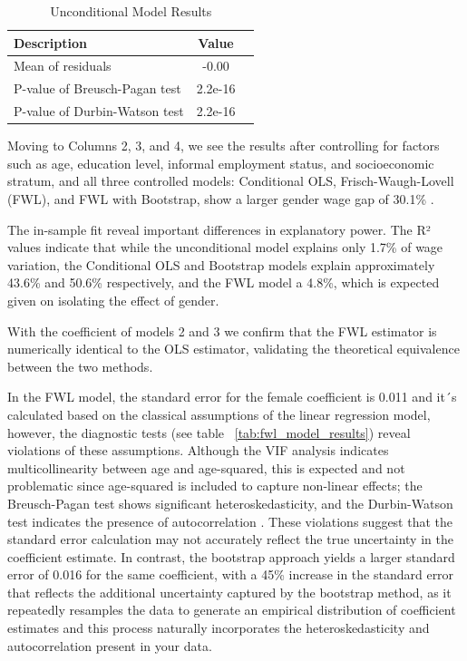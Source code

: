 \documentclass[a4paper,12pt]{article}
\begin{document}
\begin{table}[H]
\caption{Unconditional Model Results} 
\label{tab:unconditional_model_results}
\centering
\vspace{0.5cm} %
\begin{tabular}{lcc}
    \textbf{Description} & \textbf{Value} \\ 
    \hline \hline
    Mean of residuals & -0.00 \\ 
    P-value of Breusch-Pagan test & 2.2e-16\\ 
    P-value of Durbin-Watson test & 2.2e-16 \\ 
    \hline
\end{tabular}
\end{table}



Moving to Columns 2, 3, and 4, we see the results after controlling for factors such as age, education level, informal employment status, and socioeconomic stratum, and all three controlled models: Conditional OLS, Frisch-Waugh-Lovell (FWL), and FWL with Bootstrap, show a larger gender wage gap of 30.1\% .

The in-sample fit reveal important differences in explanatory power. The R² values indicate that while the unconditional model explains only 1.7\% of wage variation, the Conditional OLS and Bootstrap models explain approximately 43.6\% and 50.6\% respectively, and the FWL model a 4.8\%, which is expected given  on isolating the effect of gender. 

With the coefficient of models 2 and 3 we confirm that the FWL estimator is numerically identical to the OLS estimator, validating the theoretical equivalence between the two methods. 

In the FWL model, the standard error for the female coefficient is 0.011 and it´s calculated based on the classical assumptions of the linear regression model, however, the diagnostic tests (see table ~\ref{tab:fwl_model_results}) reveal violations of these assumptions. Although the VIF analysis indicates multicollinearity between age and age-squared, this is expected and not problematic since age-squared is included to capture non-linear effects; the Breusch-Pagan test shows significant heteroskedasticity, and the Durbin-Watson test indicates the presence of autocorrelation . These violations suggest that the  standard error calculation may not accurately reflect the true uncertainty in the coefficient estimate. In contrast, the bootstrap approach yields a larger standard error of 0.016 for the same coefficient, with a 45\% increase in the standard error that reflects the additional uncertainty captured by the bootstrap method, as it repeatedly resamples the data to generate an empirical distribution of coefficient estimates and this process naturally incorporates the heteroskedasticity and autocorrelation present in your data.
\end{document}
